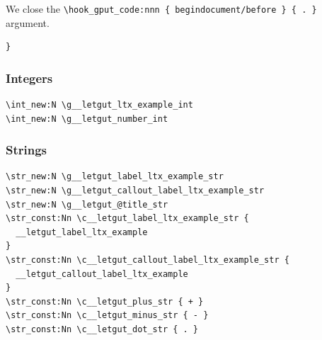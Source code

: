 \documentclass{letgut}
\begin{document}
We close the \lstinline+\hook_gput_code:nnn { begindocument/before } { . }+ argument.

\begin{lstlisting}
}
\end{lstlisting}
\subsubsection{Integers}
\label{ImplementationDeclarationsIntegers-7pag55h0jlj0}
\begin{lstlisting}
\int_new:N \g__letgut_ltx_example_int
\int_new:N \g__letgut_number_int
\end{lstlisting}
\subsubsection{Strings}
\label{ImplementationDeclarationsStrings-t7bg55h0jlj0}
\begin{lstlisting}
\str_new:N \g__letgut_label_ltx_example_str
\str_new:N \g__letgut_callout_label_ltx_example_str
\str_new:N \g__letgut_@title_str
\str_const:Nn \c__letgut_label_ltx_example_str {
  __letgut_label_ltx_example
}
\str_const:Nn \c__letgut_callout_label_ltx_example_str {
  __letgut_callout_label_ltx_example
}
\str_const:Nn \c__letgut_plus_str { + }
\str_const:Nn \c__letgut_minus_str { - }
\str_const:Nn \c__letgut_dot_str { . }
\end{lstlisting}
\end{document}

